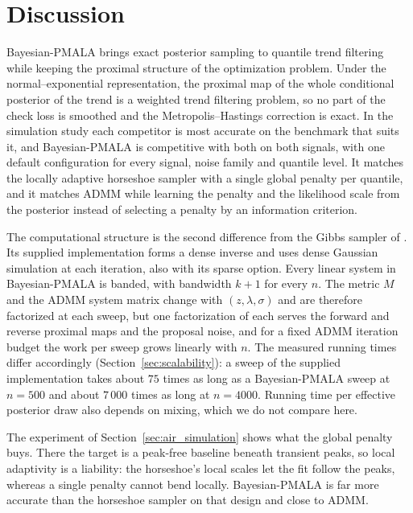 
\section{Discussion}
\label{sec:discussion}

Bayesian-PMALA brings exact posterior sampling to quantile trend filtering while keeping the proximal structure of the optimization problem. Under the normal--exponential representation, the proximal map of the whole conditional posterior of the trend is a weighted trend filtering problem, so no part of the check loss is smoothed and the Metropolis--Hastings correction is exact. In the simulation study each competitor is most accurate on the benchmark that suits it, and Bayesian-PMALA is competitive with both on both signals, with one default configuration for every signal, noise family and quantile level. It matches the locally adaptive horseshoe sampler with a single global penalty per quantile, and it matches ADMM while learning the penalty and the likelihood scale from the posterior instead of selecting a penalty by an information criterion.

The computational structure is the second difference from the Gibbs sampler of \citet{onizuka2024fast}. Its supplied implementation forms a dense inverse and uses dense Gaussian simulation at each iteration, also with its sparse option. Every linear system in Bayesian-PMALA is banded, with bandwidth $k+1$ for every $n$. The metric $M$ and the ADMM system matrix change with $(z, \lambda, \sigma)$ and are therefore factorized at each sweep, but one factorization of each serves the forward and reverse proximal maps and the proposal noise, and for a fixed ADMM iteration budget the work per sweep grows linearly with $n$. The measured running times differ accordingly (Section~\ref{sec:scalability}): a sweep of the supplied implementation takes about $75$ times as long as a Bayesian-PMALA sweep at $n = 500$ and about $7\,000$ times as long at $n = 4000$. Running time per effective posterior draw also depends on mixing, which we do not compare here.

The experiment of Section~\ref{sec:air_simulation} shows what the global penalty buys. There the target is a peak-free baseline beneath transient peaks, so local adaptivity is a liability: the horseshoe's local scales let the fit follow the peaks, whereas a single penalty cannot bend locally. Bayesian-PMALA is far more accurate than the horseshoe sampler on that design and close to ADMM.

